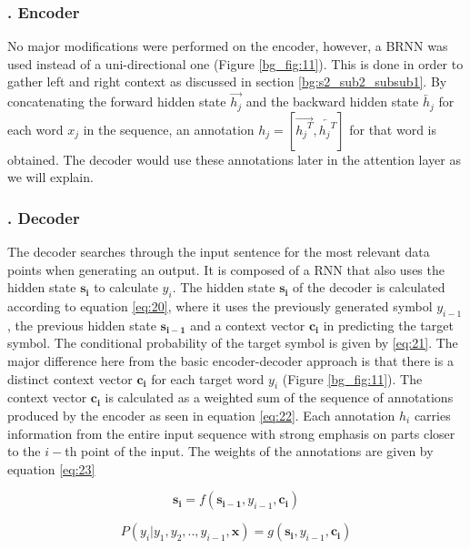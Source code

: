 \subsubsection{. Encoder} 
\label{bg:s4_sub2_subsub1}
No major modifications were performed on the encoder, however, a \ac{BRNN} was used instead of a uni-directional one (Figure \ref{bg_fig:11}). This is done in order to gather left and right context as discussed in section \ref{bg:s2_sub2_subsub1}. By concatenating the forward hidden state $ {\overrightarrow{{h_j}}}$ and the backward hidden state $ {\overleftarrow{{h_j}}}$ for each word $x_j$ in the sequence, an annotation ${h_j}=[{\overrightarrow{{{h_j}^T}}}, {\overleftarrow{{{h_j}^T}}}] $ for that word is obtained. The decoder would use these annotations later in the attention layer as we will explain.

\subsubsection{. Decoder} 
\label{bg:s4_sub2_subsub2}

The decoder searches through the input sentence for the most relevant data points when generating an output. It is composed of a  \ac{RNN} that also uses the hidden state $ \mathbf{s_i}$ to calculate $ y_i$. The hidden state $ \mathbf{s_i}$ of the decoder is calculated according to equation \ref{eq:20}, where it uses the previously generated symbol $y_{i-1}$, the previous hidden state $\mathbf{s_{i-1}}$ and a context vector $\mathbf{c_i}$ in predicting the target symbol. The conditional probability of the target symbol is given by \ref{eq:21}. The major difference here from the basic encoder-decoder approach is that there is a distinct context vector $\mathbf{c_i}$ for each target word $y_i$ (Figure \ref{bg_fig:11}). The context vector $\mathbf{c_i}$ is calculated as a weighted sum of the sequence of annotations produced by the encoder as seen in equation \ref{eq:22}. Each annotation $h_i$ carries information from the entire input sequence with strong emphasis on parts closer to the $i-$th point of the input. The weights of the annotations are given by equation \ref{eq:23}


\begin{equation}
\label{eq:20}
\mathbf{s_i} = f(\mathbf{s_{i-1}}, y_{i-1}, \mathbf{c_i})
\end{equation}

\begin{equation}
\label{eq:21}
P(y_i | y_1, y_2,.., y_{i-1}, \mathbf{x}) = g(\mathbf{s_{i}}, y_{i-1}, \mathbf{c_i})
\end{equation}

